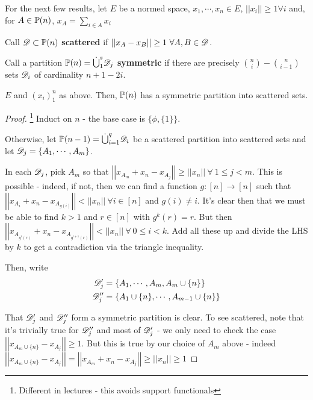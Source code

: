 \documentclass[a4paper]{article}
\begin{document}
For the next few results, let $E$ be a normed space, $x_1,\cdots, x_n\in E$, $\left|\left|x_i\right|\right|\geq 1\forall i$ and, for $A\in\P(n)$, $x_A=\sum_{i\in A}x_i$

\begin{defi}[Scattered]
	Call $\calD\subset\P(n)$ \textbf{scattered} if $\left|\left|x_A - x_B\right|\right|\geq1\ \forall A, B\in \calD$.
\end{defi}

\begin{defi}
	Call a partition $\P(n)=\dot{\bigcup}_1^s\calD_j$ \textbf{symmetric} if there are precisely $\binom{n}{i}-\binom{n}{i-1}$ sets $\calD_i$ of cardinality $n+1-2i$.
\end{defi}

\begin{thm-num}[Kleitman, 1970]
	$E$ and $(x_i)_1^n$ as above. Then, $\P(n)$ has a symmetric partition into scattered sets.
\end{thm-num}
\begin{proof}\footnote{Different in lectures - this avoids support functionals}
	Induct on $n$ - the base case is $\{\phi,\{1\}\}$.
	
	Otherwise, let $\P(n-1)=\dot{\bigcup}_{i=1}^{q}\calD_i$ be a scattered partition into scattered sets and let $\calD_j=\{A_1,\cdots,A_m\}$.
	
	In each $\calD_j$, pick $A_m$ so that $\left|\left|x_{A_m} + x_n - x_{A_j}\right|\right|\geq \left|\left|x_n\right|\right|\ \forall\ 1\leq j<m$. This is possible - indeed, if not, then we can find a function $g:[n]\rightarrow[n]$ such that $\left|\left|x_{A_i} + x_n - x_{A_{g(i)}}\right|\right|< \left|\left|x_n\right|\right|\ \forall i\in[n]$ and $g(i)\neq i$. It's clear then that we must be able to find $k>1$ and $r\in[n]$ with $g^k(r)=r$. But then $\left|\left|x_{A_{g^i(r)}} + x_n - x_{A_{g^{i+1}(r)}}\right|\right|< \left|\left|x_n\right|\right|\ \forall\ 0\leq i<k$. Add all these up and divide the LHS by $k$ to get a contradiction via the triangle inequality.
	
	Then, write
	\begin{align*}
	\calD_j'&=\{A_1,\cdots,A_m,A_m\cup\{n\}\}\\
	\calD_j''&=\{A_1\cup\{n\},\cdots,A_{m-1}\cup\{n\}\}
	\end{align*}
	
	That $\calD_j'$ and $\calD_j''$ form a symmetric partition is clear. To see scattered, note that it's trivially true for $\calD_j''$ and most of $\calD_j'$ - we only need to check the case $\left|\left|x_{A_m\cup\{n\}}-x_{A_j}\right|\right|\geq 1$. But this is true by our choice of $A_m$ above - indeed $\left|\left|x_{A_m\cup\{n\}} - x_{A_j}\right|\right|=\left|\left|x_{A_m} + x_n - x_{A_j}\right|\right|\geq \left|\left|x_n\right|\right|\geq1$
\end{proof}
\end{document}
